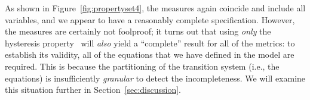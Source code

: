 As shown in Figure~\ref{fig:propertyset4}, the measures again coincide and include all variables, and we appear to have a reasonably complete specification.  However, the measures are certainly not foolproof; it turns out that using {\em only} the hysteresis property \hystp\ will {\em also} yield a ``complete'' result for all of the metrics: to establish its validity, all of the equations that we have defined in the model are required.  This is because the partitioning of the transition system (i.e., the equations) is insufficiently {\em granular} to detect the incompleteness.
We will examine this situation further in Section~\ref{sec:discussion}.
%
